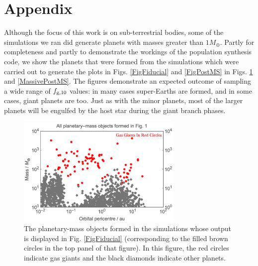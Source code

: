 \documentclass[useAMS,usenatbib]{mn2e}
\newcommand{\rev}{ }
\begin{document}
{\rev
\appendix
\renewcommand{\thefigure}{A-\arabic{figure}}
\section*{Appendix}

Although the focus of this work is on sub-terrestrial bodies, some of the simulations we ran did generate planets with masses greater than $1M_{\oplus}$. Partly for completeness and partly to demonstrate the workings of the population synthesis code, we show the planets that were formed from the simulations which were carried out to generate the plots in Figs. \ref{FigFiducial} and \ref{FigPostMS} in Figs. \ref{MassFig1} and \ref{MassivePostMS}. The figures demonstrate an expected outcome of sampling a wide range of $f_{\rm g,10}$ values: in many cases super-Earths are formed, and in some cases, giant planets are too. Just as with the minor planets, most of the larger planets will be engulfed by the host star during the giant branch phases.

\begin{figure}
\includegraphics[width=8cm]{MassiveFiducial}
\caption{
{\rev
The planetary-mass objects formed in the simulations whose output is displayed in Fig. \ref{FigFiducial} (corresponding to the filled brown circles in the top panel of that figure). In this figure, the red circles indicate gas giants and the black diamonds indicate other planets.
}
}
\label{MassFig1}
\end{figure}


}
\end{document}
